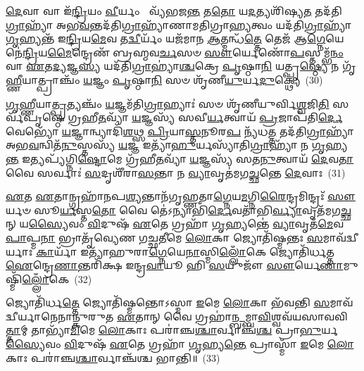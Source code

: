 {\anuvakamend[{𑌅𑌵᳴ 𑌦𑌾𑌧𑌾𑌰 \ul{𑌮𑌿}\-𑌤𑍍𑌰𑍇\-\ul{𑌣𑍈}\-𑌵 𑌪𑍍𑌰𑍀᳴𑌣𑌾\-\ul{𑌤𑌿} 𑌷𑌟𑍍𑌚᳴}]}%

\-\ul{𑌦𑍇}\-𑌵𑌾 𑌵𑌾 𑌇᳴\-\ul{𑌨𑍍𑌦𑍍𑌰𑌿}\-𑌯𑌂 \ul{𑌵𑍀}\-𑌰𑍍𑌯𑌂  𑌵𑍍𑌯᳴𑌭𑌜\-\ul{𑌨𑍍𑌤} 𑌤\-\ul{𑌤𑍋} 𑌯\-\ul{𑌦}\-𑌤𑍍𑌯𑌶𑌿᳴𑌷𑍍𑌯\-\ul{𑌤} 𑌤𑌦᳴𑌤𑌿\-\ul{𑌗𑍍𑌰𑌾}\-𑌹𑍍𑌯𑌾᳴ 𑌅𑌭\-\ul{𑌵}\-𑌨𑍍𑌤𑌦᳴𑌤𑌿\-\ul{𑌗𑍍𑌰𑌾}\-𑌹𑍍𑌯𑌾᳴𑌣𑌾𑌮𑌤𑌿𑌗𑍍𑌰𑌾\-\ul{𑌹𑍍𑌯}\-𑌤𑍍𑌵𑌂 𑌯𑌦᳴𑌤𑌿\-\ul{𑌗𑍍𑌰𑌾}\-𑌹𑍍𑌯𑌾᳴ \ul{𑌗𑍃}\-𑌹𑍍𑌯𑌨𑍍𑌤᳴ 𑌇\-\ul{𑌨𑍍𑌦𑍍𑌰𑌿}\-𑌯\-\ul{𑌮𑍇}\-𑌵 𑌤\-\ul{𑌦𑍍𑌵𑍀}\-𑌰𑍍𑌯𑌂᳴ 𑌯𑌜᳴𑌮𑌾𑌨 \ul{𑌆}\-𑌤𑍍𑌮𑌨𑍍𑌧᳴\-\ul{𑌤𑍍𑌤𑍇} 𑌤𑍇𑌜᳴ 𑌆\-\ul{𑌗𑍍𑌨𑍇}\-𑌯𑍇𑌨𑍇॑\-\ul{𑌨𑍍𑌦𑍍𑌰𑌿}\-𑌯\-\ul{𑌮𑍈}\-𑌨𑍍𑌦𑍍𑌰𑍇𑌣᳴ 𑌬𑍍𑌰𑌹𑍍𑌮𑌵\-\ul{𑌰𑍍𑌚}\-𑌸𑍞 \ul{𑌸𑍗}\-𑌰𑍍𑌯𑍇𑌣𑍋᳴\-\ul{𑌪}\-𑌸𑍍𑌤𑌮𑍍𑌭᳴\-\ul{𑌨𑌂} 𑌵𑌾 \ul{𑌏}\-𑌤\-\ul{𑌦𑍍𑌯}\-𑌜𑍍𑌞\-\ul{𑌸𑍍𑌯} 𑌯𑌦᳴𑌤𑌿\-\ul{𑌗𑍍𑌰𑌾}\-𑌹𑍍𑌯𑌾॑\-\ul{𑌶𑍍𑌚}\-𑌕𑍍𑌰𑍇 \ul{𑌪𑍃}\-𑌷𑍍𑌠𑌾\-\ul{𑌨𑌿} 𑌯𑌤𑍍𑌪𑍃\-\ul{𑌷𑍍𑌠𑍍𑌯𑍇} 𑌨 𑌗𑍃᳴\-\ul{𑌹𑍍𑌣𑍀}\-𑌯𑌾𑌤𑍍𑌪𑍍𑌰𑌾𑌞𑍍𑌚𑌂᳴ \ul{𑌯}\-𑌜𑍍𑌞𑌂 \ul{𑌪𑍃}\-𑌷𑍍𑌠𑌾\-\ul{𑌨𑌿} 𑌸𑍞 𑌶𑍃᳴𑌣𑍀\-\ul{𑌯𑍁}\-𑌰𑍍𑌯\-\ul{𑌦𑍁}\-𑌕𑍍𑌥𑍍𑌯𑍇॑~(30)

\-\ul{𑌗𑍃}\-\-\ul{𑌹𑍍𑌣𑍀}\-𑌯𑌾\-\ul{𑌤𑍍𑌪𑍍𑌰}\-𑌤𑍍𑌯𑌞𑍍𑌚𑌂᳴ \ul{𑌯}\-𑌜𑍍𑌞𑌮᳴𑌤𑌿\-\ul{𑌗𑍍𑌰𑌾}\-𑌹𑍍𑌯𑌾𑌃॑ 𑌸𑍞 𑌶𑍃᳴𑌣𑍀𑌯𑍁𑌰𑍍𑌵𑌿\-\ul{𑌶𑍍𑌵}\-𑌜𑌿\-\ul{𑌤𑌿} 𑌸𑌰𑍍𑌵᳴𑌪𑍃𑌷𑍍𑌠𑍇 𑌗𑍍𑌰𑌹𑍀\-\ul{𑌤}\-𑌵𑍍𑌯𑌾᳴ \ul{𑌯}\-𑌜𑍍𑌞𑌸𑍍𑌯᳴ 𑌸𑌵𑍀\-\ul{𑌰𑍍𑌯}\-𑌤𑍍𑌵𑌾𑌯᳴ \ul{𑌪𑍍𑌰}\-𑌜𑌾𑌪᳴𑌤𑌿\-\ul{𑌰𑍍𑌦𑍇}\-𑌵𑍇𑌭𑍍𑌯𑍋᳴ \ul{𑌯}\-𑌜𑍍𑌞𑌾𑌨𑍍𑌵𑍍𑌯𑌾𑌦𑌿᳴\-\ul{𑌶}\-𑌥𑍍𑌸 \ul{𑌪𑍍𑌰𑌿}\-𑌯𑌾\-\ul{𑌸𑍍𑌤}\-𑌨𑍂𑌰\-\ul{𑌪} 𑌨𑍍𑌯᳴𑌧\-\ul{𑌤𑍍𑌤} 𑌤𑌦᳴𑌤𑌿\-\ul{𑌗𑍍𑌰𑌾}\-𑌹𑍍𑌯𑌾᳴ 𑌅𑌭\-\ul{𑌵}\-𑌨𑍍𑌵𑌿𑌤᳴\-\ul{𑌨𑍁}\-𑌸𑍍𑌤𑌸𑍍𑌯᳴ \ul{𑌯}\-𑌜𑍍𑌞 𑌇𑌤𑍍𑌯𑌾᳴\-\ul{𑌹𑍁}\-𑌰𑍍𑌯𑌸𑍍𑌯𑌾᳴𑌤𑌿\-\ul{𑌗𑍍𑌰𑌾}\-𑌹𑍍𑌯𑌾᳴ 𑌨 \ul{𑌗𑍃}\-𑌹𑍍𑌯\-\ul{𑌨𑍍𑌤} 𑌇𑌤𑍍𑌯𑌪𑍍𑌯᳴𑌗𑍍𑌨𑌿\-\ul{𑌷𑍍𑌟𑍋}\-𑌮𑍇 𑌗𑍍𑌰᳴𑌹𑍀\-\ul{𑌤}\-𑌵𑍍𑌯𑌾᳴ \ul{𑌯}\-𑌜𑍍𑌞𑌸𑍍𑌯᳴ 𑌸𑌤\-\ul{𑌨𑍁}\-𑌤𑍍𑌵𑌾𑌯᳴ \ul{𑌦𑍇}\-𑌵\-\ul{𑌤𑌾} 𑌵𑍈 𑌸𑌰𑍍𑌵𑌾𑌃॑ \ul{𑌸}\-𑌦𑍃𑌶𑍀᳴𑌰𑌾\-\ul{𑌸}\-𑌨𑍍𑌤𑌾 𑌨 \ul{𑌵𑍍𑌯𑌾}\-𑌵𑍃𑌤॑𑌮𑌗\-\ul{𑌚𑍍𑌛}\-𑌨𑍍𑌤𑍇 \ul{𑌦𑍇}\-𑌵𑌾𑌃~(31)

\-\ul{𑌏}\-𑌤 \ul{𑌏}\-𑌤𑌾𑌨𑍍𑌗𑍍𑌰𑌹𑌾᳴𑌨𑌪\-\ul{𑌶𑍍𑌯}\-𑌨𑍍𑌤𑌾𑌨᳴𑌗𑍃𑌹𑍍𑌣𑌤𑌾\-\ul{𑌗𑍍𑌨𑍇}\-𑌯\-\ul{𑌮}\-𑌗𑍍𑌨𑌿\-\ul{𑌰𑍈}\-𑌨𑍍𑌦𑍍𑌰𑌮𑌿𑌨𑍍𑌦𑍍𑌰𑌃᳴ \ul{𑌸𑍗}\-𑌰𑍍𑌯𑍞 𑌸𑍂\-\ul{𑌰𑍍𑌯}\-𑌸𑍍𑌤\-\ul{𑌤𑍋} 𑌵𑍈 𑌤𑍇॑\-𑌽𑌨𑍍𑌯𑌾𑌭𑌿᳴\-\ul{𑌰𑍍𑌦𑍇}\-𑌵𑌤𑌾᳴𑌭𑌿\-\ul{𑌰𑍍𑌵𑍍𑌯𑌾}\-𑌵𑍃𑌤᳴𑌮𑌗\-\ul{𑌚𑍍𑌛}\-𑌨𑍍 𑌯\-\ul{𑌸𑍍𑌯𑍈}\-𑌵𑌂 \ul{𑌵𑌿}\-𑌦𑍁𑌷᳴ \ul{𑌏}\-𑌤𑍇 𑌗𑍍𑌰𑌹𑌾᳴ \ul{𑌗𑍃}\-𑌹𑍍𑌯𑌨𑍍𑌤𑍇॑ \ul{𑌵𑍍𑌯𑌾}\-𑌵𑍃𑌤᳴\-\ul{𑌮𑍇}\-𑌵 \ul{𑌪𑌾}\-𑌪𑍍𑌮\-\ul{𑌨𑌾} 𑌭𑍍𑌰𑌾𑌤𑍃᳴𑌵𑍍𑌯𑍇𑌣 𑌗𑌚𑍍𑌛\-\ul{𑌤𑍀}\-𑌮𑍇 \ul{𑌲𑍋}\-𑌕𑌾 𑌜𑍍𑌯𑍋𑌤𑌿᳴𑌷𑍍𑌮𑌨𑍍𑌤𑌃 \ul{𑌸}\-𑌮𑌾𑌵᳴𑌦𑍍𑌵𑍀𑌰𑍍𑌯𑌾𑌃 \ul{𑌕𑌾}\-𑌰𑍍𑌯𑌾᳴ 𑌇𑌤𑍍𑌯𑌾᳴𑌹𑍁𑌰𑌾\-\ul{𑌗𑍍𑌨𑍇}\-𑌯𑍇\-\ul{𑌨𑌾}\-𑌸𑍍𑌮𑌿\-\ul{𑌲𑍍𑌲𑍋𑌁}\-𑌕𑍇 𑌜𑍍𑌯𑍋𑌤𑌿᳴𑌰𑍍𑌧𑌤𑍍𑌤 \ul{𑌐}\-𑌨𑍍𑌦𑍍𑌰𑍇\-\ul{𑌣𑌾}\-𑌨𑍍𑌤𑌰𑌿᳴𑌕𑍍𑌷 𑌇𑌨𑍍𑌦𑍍𑌰\-\ul{𑌵𑌾}\-𑌯𑍂 𑌹𑌿 \ul{𑌸}\-𑌯𑍁𑌜𑍗᳴ \ul{𑌸𑍗}\-𑌰𑍍𑌯𑍇\-\ul{𑌣𑌾}\-𑌮𑍁𑌷𑍍𑌮𑌿᳴\-\ul{𑌲𑍍𑌲𑍋𑌁}\-𑌕𑍇~(32)

𑌜𑍍𑌯𑍋𑌤𑌿᳴𑌰𑍍𑌧\-\ul{𑌤𑍍𑌤𑍇} 𑌜𑍍𑌯𑍋𑌤𑌿᳴𑌷𑍍𑌮𑌨𑍍𑌤𑍋\-𑌽𑌸𑍍𑌮𑌾 \ul{𑌇}\-𑌮𑍇 \ul{𑌲𑍋}\-𑌕𑌾 𑌭᳴𑌵𑌨𑍍𑌤𑌿 \ul{𑌸}\-𑌮𑌾𑌵᳴𑌦𑍍𑌵𑍀𑌰𑍍𑌯𑌾𑌨𑍇𑌨𑌾𑌨𑍍𑌕𑍁𑌰𑍁𑌤 \ul{𑌏}\-𑌤𑌾𑌨𑍍 𑌵𑍈 𑌗𑍍𑌰𑌹𑌾॑\-\ul{𑌨𑍍𑌬}\-𑌮𑍍𑌬𑌾\-\ul{𑌵𑌿}\-𑌶𑍍𑌵𑌵᳴𑌯𑌸𑌾𑌵𑌵𑌿\-\ul{𑌤𑍍𑌤𑌾}\-𑌮𑍍 𑌤𑌾𑌭𑍍𑌯𑌾᳴\-\ul{𑌮𑌿}\-𑌮𑍇 \ul{𑌲𑍋}\-𑌕𑌾𑌃 𑌪𑌰𑌾॑𑌞𑍍𑌚\-\ul{𑌶𑍍𑌚𑌾}\-𑌰𑍍𑌵𑌾𑌞𑍍𑌚᳴\-\ul{𑌶𑍍𑌚} 𑌪𑍍𑌰𑌾\-\ul{𑌭𑍁}\-𑌰𑍍𑌯\-\ul{𑌸𑍍𑌯𑍈}\-𑌵𑌂 \ul{𑌵𑌿}\-𑌦𑍁𑌷᳴ \ul{𑌏}\-𑌤𑍇 𑌗𑍍𑌰𑌹𑌾᳴ \ul{𑌗𑍃}\-𑌹𑍍𑌯\-\ul{𑌨𑍍𑌤𑍇} 𑌪𑍍𑌰𑌾𑌸𑍍𑌮𑌾᳴ \ul{𑌇}\-𑌮𑍇 \ul{𑌲𑍋}\-𑌕𑌾𑌃 𑌪𑌰𑌾॑𑌞𑍍𑌚\-\ul{𑌶𑍍𑌚𑌾}\-𑌰𑍍𑌵𑌾𑌞𑍍𑌚᳴𑌶𑍍𑌚 𑌭𑌾𑌨𑍍𑌤𑌿॥~(33)

